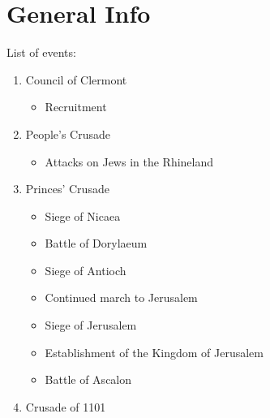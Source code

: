 \documentclass[11pt]{book}
\begin{document}
\section{General Info}
List of events:
\begin{enumerate}
   \item Council of Clermont
   \begin{itemize}
     \item Recruitment
   \end{itemize}
   \item People's Crusade
   \begin{itemize}
   	\item Attacks on Jews in the Rhineland
   \end{itemize}
   \item Princes' Crusade \cite{CrusadeBook1}
   \begin{itemize}
   	\item Siege of Nicaea
   	\item Battle of Dorylaeum
   	\item Siege of Antioch
   	\item Continued march to Jerusalem
   	\item Siege of Jerusalem
   	\item Establishment of the Kingdom of Jerusalem
   	\item  Battle of Ascalon
   \end{itemize}
   \item Crusade of 1101
\end{enumerate}
\newpage
\end{document}
